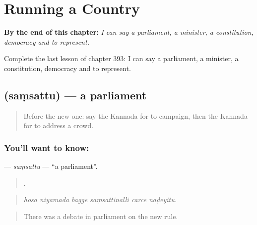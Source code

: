 
\chapter{Running a Country}
\label{ch:ka-running-a-country}

\begin{chapteropening}
\textbf{By the end of this chapter:} \emph{I can say a parliament, a minister, a constitution, democracy and to represent.}

Complete the last lesson of chapter 393: I can say a parliament, a minister, a constitution, democracy and to represent.
\end{chapteropening}

\section[\texorpdfstring{\kn{ಸಂಸತ್ತು} (saṃsattu)}{ಸಂಸತ್ತು (saṃsattu)}]{ (saṃsattu) — a parliament}

\label{lesson:KA-C393-samsattu}



\begin{quote}
Before the new one: say the Kannada for to campaign, then the Kannada for to address a crowd.
\end{quote}

\subsection*{You'll want to know: }
\textbf{} — \emph{saṃsattu} — \textquotedblleft{}a parliament\textquotedblright{}.

\begin{quote}
     .
\end{quote}

\begin{quote}
\emph{hosa niyamada bagge saṃsattinalli carce naḍeyitu.}
\end{quote}

\begin{quote}
There was a debate in parliament on the new rule.
\end{quote}

